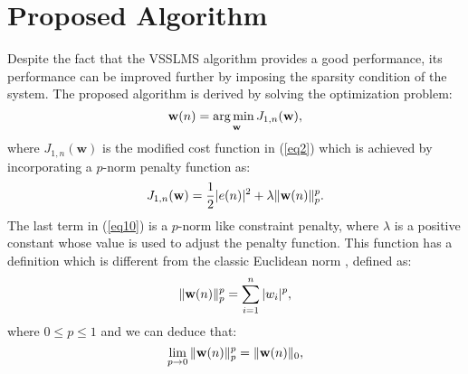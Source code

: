 \section{Proposed Algorithm}\label{sec:4.3}
\vspace{-0.5cm}
\noindent Despite the fact that the VSSLMS algorithm provides a good performance, its performance can be improved further by imposing the sparsity condition of the system. The proposed algorithm is derived by solving the optimization problem:
\vspace{-0.1cm}
\begin{equation}
\textbf{w}(n)=\operatorname*{arg\,min}_{\hspace{5pt}\textbf{w}} J_{1,n}(\textbf{w}),\label{eq9}\vspace{-0.1cm}
\end{equation}
\noindent where $J_{1,n}(\textbf{w})$ is the modified cost function  in (\ref{eq2}) which is achieved by incorporating a $p$-norm penalty function as:
%
\vspace{-0.1cm}
\begin{equation}
J_{1,n}(\textbf{w})=\frac{1}{2}|e(n)|^2 +\lambda\|\textbf{w}(n)\|_p^p.\label{eq10}\vspace{-0.1cm}
\end{equation}
\noindent The last term in (\ref{eq10}) is a $p$-norm like constraint penalty, where $\lambda$ is a positive constant whose value is used to adjust the penalty function. This function has a definition which is different from the classic Euclidean norm \cite{Tong}, defined as:
\vspace{-0.1cm}
\begin{equation}
\|\textbf{w}(n)\|_p^p=\sum_{i=1}^{n}|w_i|^p,\label{eq11}\vspace{-0.1cm}
\end{equation}
\noindent where $0\leq p\leq 1$ and we can deduce that:
\vspace{-0.1cm}
\begin{equation}
\lim_{p\to 0}\|\textbf{w}(n)\|_p^p=\|\textbf{w}(n)\|_{0},\label{eq12}\vspace{-0.1cm}
\end{equation}
